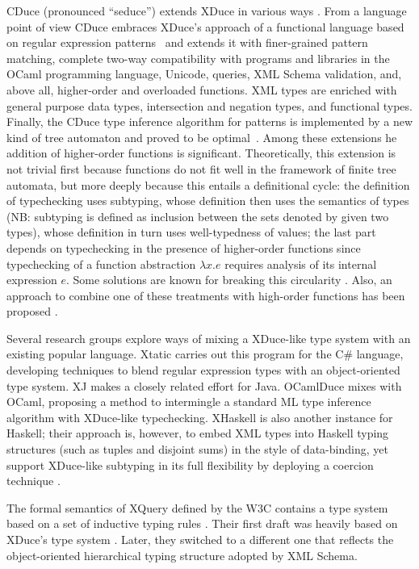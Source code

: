 \documentclass[twoside,leqno,onecolumn,pdftex]{article}
\begin{document}
\begin{scientific}
CDuce (pronounced ``seduce'') extends XDuce in various ways
\cite{cduce2003}.  From a language point of view CDuce embraces
XDuce's approach of a functional language based on regular expression
patterns~\cite{HosoyaPierceRegpatJFP} and extends it with
finer-grained pattern matching, complete two-way compatibility with
programs and libraries in the OCaml programming language, Unicode, 
queries, XML Schema validation,
and, above all, higher-order and overloaded functions. XML types are
enriched with general purpose data types, intersection and negation
types, and functional types. Finally, the CDuce type inference algorithm
for patterns is implemented by a new kind of tree automaton and proved
to be optimal~\cite{Frisch04}. Among these extensions he addition of
higher-order functions is significant.  Theoretically, this extension
is not trivial first because functions do not fit well in the
framework of finite tree automata, but more deeply because this
entails a definitional cycle: the definition of
typechecking uses subtyping, whose definition then uses the semantics
of types (NB: subtyping is defined as inclusion between the sets
denoted by given two types), whose definition in turn uses
well-typedness of values; the last part depends on typechecking in the
presence of higher-order functions since typechecking of a function
abstraction $\lambda x.e$ requires analysis of its internal expression
$e$.  Some solutions are known for breaking this circularity
\cite{FrischLICS02,VouillonPOPL06}.  Also, an approach to combine one
of these treatments with high-order functions has been proposed
\cite{VouillonPOPL06}.

Several research groups explore ways of mixing a XDuce-like type
system with an existing popular language.  Xtatic
\cite{XtaticExperience} carries out this program for the C\# language, developing
techniques to blend regular expression types with an object-oriented
type system.  XJ \cite{harren-raghavachari-shmueli-05} makes a closely
related effort for Java.  OCamlDuce \cite{ocamlduce} mixes with OCaml,
proposing a method to intermingle a standard ML type inference
algorithm with XDuce-like typechecking.  XHaskell \cite{LuSulzmann04}
is also another instance for Haskell; their approach is, however, to
embed XML types into Haskell typing structures (such as tuples and
disjoint sums) in the style of data-binding, yet support XDuce-like
subtyping in its full flexibility by deploying a coercion technique
\cite{Sulzmann06}.

The formal semantics of XQuery defined by the W3C contains a type
system based on a set of inductive typing rules \cite{XQuery}.  Their
first draft was heavily based on XDuce's type system
\cite{FernandezSimeonWadler01}.  Later, they switched to a different
one that reflects the object-oriented hierarchical typing structure
adopted by XML Schema.


\end{scientific}
\end{document}
